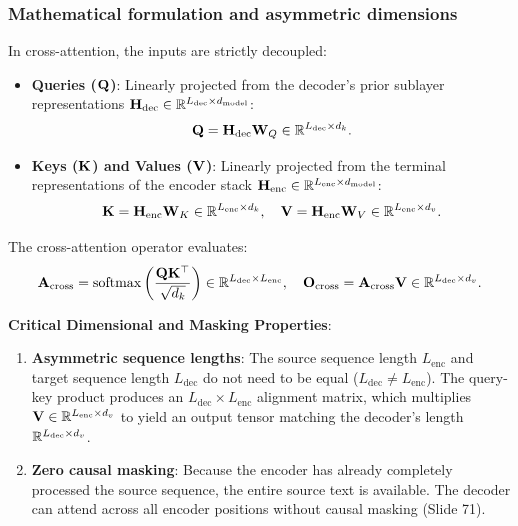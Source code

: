 \documentclass[../../../main.tex]{subfiles}
\begin{document}
\subsubsection{Mathematical formulation and asymmetric dimensions}
In cross-attention, the inputs are strictly decoupled:
\begin{itemize}
    \item \textbf{Queries ($\mathbf{Q}$)}: Linearly projected from the decoder's prior sublayer representations $\mathbf{H}_{\text{dec}} \in \mathbb{R}^{L_{\text{dec}} \times d_{\text{model}}}$:
    \begin{equation}
    \mathbf{Q} = \mathbf{H}_{\text{dec}} \mathbf{W}_Q \in \mathbb{R}^{L_{\text{dec}} \times d_k}.
    \end{equation}
    \item \textbf{Keys ($\mathbf{K}$) and Values ($\mathbf{V}$)}: Linearly projected from the terminal representations of the encoder stack $\mathbf{H}_{\text{enc}} \in \mathbb{R}^{L_{\text{enc}} \times d_{\text{model}}}$:
    \begin{equation}
    \mathbf{K} = \mathbf{H}_{\text{enc}} \mathbf{W}_K \in \mathbb{R}^{L_{\text{enc}} \times d_k}, \quad \mathbf{V} = \mathbf{H}_{\text{enc}} \mathbf{W}_V \in \mathbb{R}^{L_{\text{enc}} \times d_v}.
    \end{equation}
\end{itemize}
The cross-attention operator evaluates:
\begin{equation}
\label{eq:cross_attention_formula_ch5}
\mathbf{A}_{\text{cross}} = \operatorname{\mathrm{softmax}}\left( \frac{\mathbf{Q} \mathbf{K}^\top}{\sqrt{d_k}} \right) \in \mathbb{R}^{L_{\text{dec}} \times L_{\text{enc}}}, \quad \mathbf{O}_{\text{cross}} = \mathbf{A}_{\text{cross}} \mathbf{V} \in \mathbb{R}^{L_{\text{dec}} \times d_v}.
\end{equation}

\noindent\textbf{Critical Dimensional and Masking Properties}:
\begin{enumerate}
    \item \textbf{Asymmetric sequence lengths}: The source sequence length $L_{\text{enc}}$ and target sequence length $L_{\text{dec}}$ do not need to be equal ($L_{\text{dec}} \neq L_{\text{enc}}$). The query-key product produces an $L_{\text{dec}} \times L_{\text{enc}}$ alignment matrix, which multiplies $\mathbf{V} \in \mathbb{R}^{L_{\text{enc}} \times d_v}$ to yield an output tensor matching the decoder's length $\mathbb{R}^{L_{\text{dec}} \times d_v}$.
    \item \textbf{Zero causal masking}: Because the encoder has already completely processed the source sequence, the entire source text is available. The decoder can attend across all encoder positions without causal masking (Slide 71).
\end{enumerate}
\end{document}
